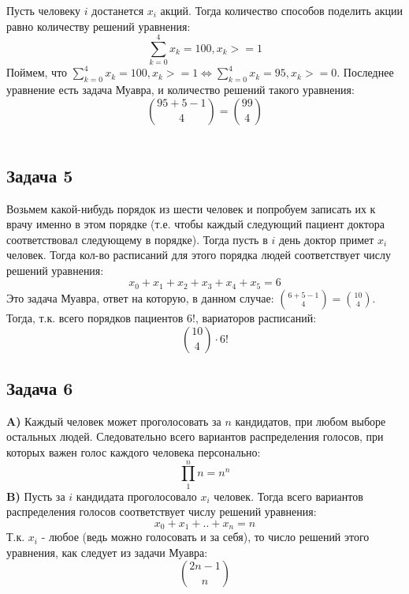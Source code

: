 \documentclass{article}
\begin{document}
Пусть человеку $i$  достанется $x_i$ акций. Тогда количество способов поделить акции равно количеству решений уравнения:
$$ \sum_{k=0}^{4} x_k = 100, x_k >= 1$$
Поймем, что $\sum_{k=0}^{4} x_k = 100, x_k >= 1 \Leftrightarrow \sum_{k=0}^{4} x_k = 95, x_k >= 0$. Последнее уравнение есть задача Муавра, и количество решений такого уравнения:
$$ {95 + 5 - 1 \choose 4} = {99 \choose 4}$$ 
\\
\begin{center}
	\subsection*{Задача 5}
\end{center}
Возьмем какой-нибудь порядок из шести человек и попробуем записать их к врачу именно в этом порядке (т.е. чтобы каждый следующий пациент доктора соответствовал следующему в порядке). Тогда пусть в $i$ день доктор примет $x_i$ человек. Тогда кол-во расписаний для этого порядка людей соответствует числу решений уравнения:
$$ x_0 + x_1 + x_2 + x_3 + x_4 + x_5 = 6 $$
Это задача Муавра, ответ на которую, в данном случае: $ {6 + 5 - 1 \choose 4} = {10 \choose 4}$.
Тогда, т.к. всего порядков пациентов $6!$, вариаторов расписаний:
 $$ {10 \choose 4} \cdot 6!$$
 
 \begin{center}
 	\subsection*{Задача 6}
 \end{center}
 
 \textbf{A)} Каждый человек может проголосовать за $n$ кандидатов, при любом выборе остальных людей. Следовательно всего вариантов распределения голосов, при которых важен голос каждого человека персонально: 
 $$ \prod_{1}^{n} n = n^n $$ 
\textbf{B)} Пусть за $i$ кандидата проголосовало $x_i$ человек. Тогда всего вариантов распределения голосов соответствует числу решений уравнения:
$$ x_0 + x_1 + .. + x_n = n $$
Т.к. $x_i$ - любое (ведь можно голосовать и за себя), то число решений этого уравнения, как следует из задачи Муавра: 
$$ {2n - 1 \choose n} $$
\end{document}
